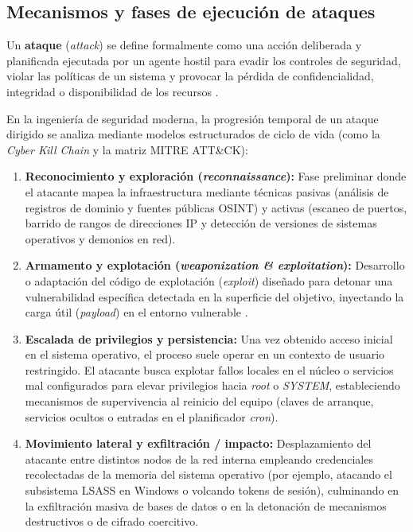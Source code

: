 \documentclass[12pt]{article}
\begin{document}
\subsection{Mecanismos y fases de ejecución de ataques}\label{subsec:mecanismosFasesAtaques}

Un \textbf{ataque} (\textit{attack}) se define formalmente como una acción deliberada y planificada ejecutada por un agente hostil para evadir los controles de seguridad, violar las políticas de un sistema y provocar la pérdida de confidencialidad, integridad o disponibilidad de los recursos \parencite[\S 2, p.\ 22]{rfc4949}.

En la ingeniería de seguridad moderna, la progresión temporal de un ataque dirigido se analiza mediante modelos estructurados de ciclo de vida (como la \textit{Cyber Kill Chain} y la matriz MITRE ATT\&CK):
\begin{enumerate}[noitemsep, topsep=2pt]
    \item \textbf{Reconocimiento y exploración (\textit{reconnaissance}):} Fase preliminar donde el atacante mapea la infraestructura mediante técnicas pasivas (análisis de registros de dominio y fuentes públicas OSINT) y activas (escaneo de puertos, barrido de rangos de direcciones IP y detección de versiones de sistemas operativos y demonios en red).
    \item \textbf{Armamento y explotación (\textit{weaponization \& exploitation}):} Desarrollo o adaptación del código de explotación (\textit{exploit}) diseñado para detonar una vulnerabilidad específica detectada en la superficie del objetivo, inyectando la carga útil (\textit{payload}) en el entorno vulnerable \parencite[\S 19.5.4, p.\ 946]{deitel2004operating}.
    \item \textbf{Escalada de privilegios y persistencia:} Una vez obtenido acceso inicial en el sistema operativo, el proceso suele operar en un contexto de usuario restringido. El atacante busca explotar fallos locales en el núcleo o servicios mal configurados para elevar privilegios hacia \textit{root} o \textit{SYSTEM}, estableciendo mecanismos de supervivencia al reinicio del equipo (claves de arranque, servicios ocultos o entradas en el planificador \textit{cron}).
    \item \textbf{Movimiento lateral y exfiltración / impacto:} Desplazamiento del atacante entre distintos nodos de la red interna empleando credenciales recolectadas de la memoria del sistema operativo (por ejemplo, atacando el subsistema LSASS en Windows o volcando tokens de sesión), culminando en la exfiltración masiva de bases de datos o en la detonación de mecanismos destructivos o de cifrado coercitivo.
\end{enumerate}
\end{document}
